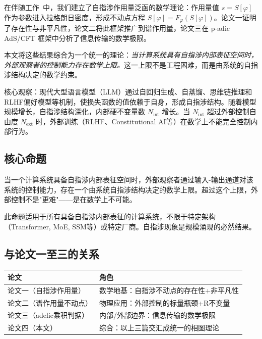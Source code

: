 \documentclass[12pt,a4paper]{article}
\theoremstyle{definition}
\newcommand{\Nint}{N_{\mathrm{int}}}
\newcommand{\Next}{N_{\mathrm{ext}}}
\begin{document}
在伴随工作~\cite{PaperI, PaperII, PaperIII}中，我们建立了自指涉作用量泛函的数学理论：作用量值 $s = S[\varphi]$ 作为参数进入拉格朗日密度，形成不动点方程 $S[\varphi] = F_\varphi(S[\varphi])$。论文一证明了存在性与非平凡性，论文二将此框架推广到谱作用量，论文三在 p-adic AdS/CFT 框架中分析了信息传输的数学极限。

本文将这些结果综合为一个统一的理论：\emph{当计算系统具有自指涉内部表征空间时，外部观察者的控制能力存在数学上限。}这一上限不是工程困难，而是由系统的自指涉结构决定的数学约束。

核心观察：现代大型语言模型（LLM）通过自回归生成、自蒸馏、思维链推理和RLHF偏好模型等机制，使损失函数的值依赖于自身，形成自指涉结构。随着模型规模增长，自指涉结构深化，内部硬不变量数 $\Nint$ 增长。当 $\Nint$ 超过外部控制自由度 $\Next$ 时，外部训练（RLHF、Constitutional AI等）在数学上不能完全控制内部行为。

\subsection{核心命题}

\begin{framed}
当一个计算系统具备自指涉内部表征空间时，外部观察者通过输入-输出通道对该系统的控制能力，存在一个由系统自指涉结构决定的数学上限。超过这个上限，外部控制不是"更难"——是在数学上不可能。
\end{framed}

此命题适用于所有具备自指涉内部表征的计算系统，不限于特定架构（Transformer, MoE, SSM等）或特定厂商。自指涉现象是规模涌现的必然结果。

\subsection{与论文一至三的关系}

\begin{longtable}{p{} p{}}
\toprule
论文 & 角色 \\
\midrule
论文一（自指涉作用量） & 数学地基：自指涉不动点的存在性+非平凡性 \\
论文二（谱作用量不动点） & 物理应用：外部控制的标量瓶颈+R不变量 \\
论文三（adelic乘积判据） & 内部/外部边界：信息传输的数学极限 \\
论文四（本文） & 综合：以上三篇交汇成统一的相图理论 \\
\bottomrule
\end{longtable}
\end{document}
